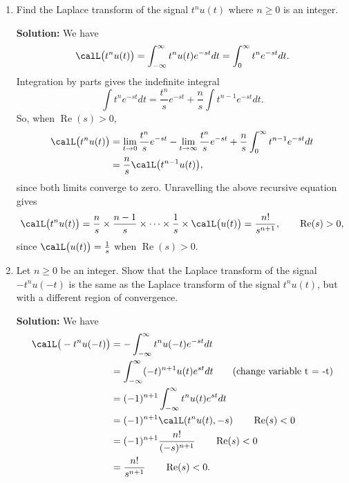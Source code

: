 \documentclass[11pt,a4paper]{book}
\theoremstyle{plain}
\numberwithin{equation}{section}
\renewcommand{\Re}{\operatorname{Re}}
\newenvironment{solution}{\begin{footnotesize}\textbf{Solution:}}{\end{footnotesize}}
\newenvironment{excersizelist}{%
  \renewcommand*{\theenumi}{\thechapter.\arabic{enumi}}%
  \newcommand\itemadvanced{\stepcounter{enumi}\item[$\ast$\, \theenumi.]}
  \begin{enumerate}
}{%
  \end{enumerate}
}
\begin{document}
\begin{excersizelist}
\item \label{excer:laplacetransformcommonpolyut} Find the Laplace transform of the signal $t^n u(t)$ where $n\geq 0$ is an integer.
\begin{solution}
We have
\[
\calL\big(t^nu(t)\big) = \int_{-\infty}^{\infty} t^nu(t) e^{-st} dt = \int_{0}^{\infty} t^n e^{-st} dt.
\]
Integration by parts gives the indefinite integral
\[
\int t^n e^{-st} dt = \frac{t^n}{s} e^{-st} + \frac{n}{s} \int t^{n-1} e^{-st} dt.
\]
So, when $\Re(s) > 0$,
\begin{align*}
\calL\big(t^nu(t)\big) &= \lim_{t \to 0}\frac{t^n}{s} e^{-st} - \lim_{t \to \infty}\frac{t^n}{s} e^{-st} + \frac{n}{s} \int_{0}^\infty t^{n-1} e^{-st} dt \\
&= \frac{n}{s} \calL\big(t^{n-1}u(t)\big),
\end{align*}
since both limits converge to zero.  Unravelling the above recursive equation gives
\[
\calL\big(t^nu(t)\big) = \frac{n}{s}\times\frac{n-1}{s}\times\cdots\times\frac{1}{s}\times\calL\big(u(t)\big) = \frac{n!}{s^{n+1}}, \qquad \Re(s) > 0,
\]
since $\calL\big(u(t)\big) = \tfrac{1}{s}$ when $\Re(s) >0$. 
\end{solution}

\item Let $n \geq 0$ be an integer.  Show that the Laplace transform of the signal $- t^n u(-t)$ is the same as the Laplace transform of the signal $t^n u(t)$, but with a different region of convergence.
\begin{solution}
We have
\begin{align*}
\calL\big(-t^nu(-t)\big) &= -\int_{-\infty}^{\infty} t^nu(-t) e^{-st} dt \\
&= \int_{-\infty}^{\infty} (-t)^{n+1} u(t) e^{st} dt \qquad \text{(change variable t = -t)} \\
&= (-1)^{n+1} \int_{-\infty}^{\infty} t^n u(t) e^{st} dt \\
&= (-1)^{n+1} \calL( t^n u(t), -s) \qquad \Re(s) < 0 \\
&= (-1)^{n+1} \frac{n!}{(-s)^{n+1}} \qquad \Re(s) < 0 \\
&= \frac{n!}{s^{n+1}} \qquad \Re(s) < 0.
\end{align*}
\end{solution}



\end{excersizelist}
\end{document}
